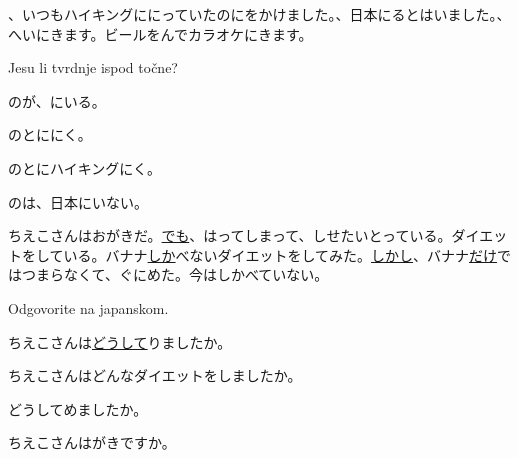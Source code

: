 
\author{Tomislav Mamić}


	
	\begin{bunshou}
		、いつもハイキングににっていたのにをかけました。、日本にるとはいました。、へいにきます。ビールをんでカラオケにきます。
	\end{bunshou}
	
	\begin{mondai}{Jesu li tvrdnje ispod točne?}
		\item {}のが、\furigana{東京}{とうきょう}にいる。
		\item {}のとにに\furigana{行}{い}く。
		\item {}のとにハイキングに\furigana{行}{い}く。
		\item {}のは、日本にいない。
	\end{mondai}

	\begin{bunshou}
		ちえこさんはおがきだ。\underline{でも}、はってしまって、しせたいとっている。ダイエットをしている。バナナ\underline{しか}べないダイエットをしてみた。\underline{しかし}、バナナ\underline{だけ}ではつまらなくて、ぐにめた。今はしかべていない。
	\end{bunshou}

	\begin{mondai}{Odgovorite na japanskom.}
		\item ちえこさんは\underline{どうして}りましたか。
		\item ちえこさんはどんなダイエットをしましたか。
		\item どうしてめましたか。
		\item ちえこさんはがきですか。
	\end{mondai}
